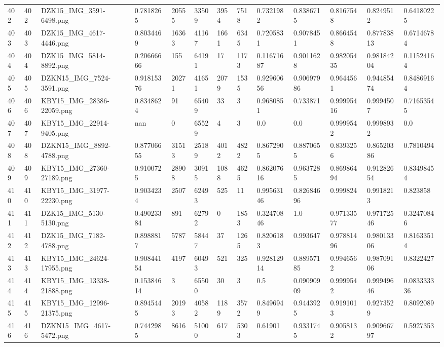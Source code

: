 \documentclass[11pt, a4paper, twoside]{report}
\begin{document}
\begin{longtable}[c]{@{}lllllllllllll@{}}
402 & 402 & DZK15\_IMG\_3591-6498.png & 0.7818265 & 20555 & 33509 & 3954 & 7518 & 0.7321982 & 0.8386715 & 0.8167548 & 0.8249512 & 0.64180225 \\
403 & 403 & DZK15\_IMG\_4617-4446.png & 0.8034469 & 16363 & 41167 & 1661 & 6345 & 0.7205831 & 0.9078451 & 0.8664548 & 0.87783813 & 0.67146784 \\
404 & 404 & DZK15\_IMG\_5814-8892.png & 0.20666666 & 155 & 64191 & 17 & 1173 & 0.11671687 & 0.9011628 & 0.98205435 & 0.98184204 & 0.11524164 \\
405 & 405 & DZKN15\_IMG\_7524-3591.png & 0.91815376 & 20271 & 41651 & 2079 & 1535 & 0.92960656 & 0.90697986 & 0.9644561 & 0.94485474 & 0.84869164 \\
406 & 406 & KBY15\_IMG\_28386-22059.png & 0.8348624 & 91 & 65409 & 33 & 3 & 0.9680851 & 0.733871 & 0.99995416 & 0.9994507 & 0.71653545 \\
407 & 407 & KBY15\_IMG\_22914-9405.png & nan & 0 & 65529 & 4 & 3 & 0.0 & 0.0 & 0.9999542 & 0.9998932 & 0.0 \\
408 & 408 & DZKN15\_IMG\_8892-4788.png & 0.87706655 & 31513 & 25189 & 4012 & 4822 & 0.8672905 & 0.8870655 & 0.8393256 & 0.86520386 & 0.7810494 \\
409 & 409 & KBY15\_IMG\_27360-27189.png & 0.9100725 & 28908 & 30915 & 1088 & 4625 & 0.86207616 & 0.9637285 & 0.86986494 & 0.91282654 & 0.83498454 \\
410 & 410 & KBY15\_IMG\_31977-22230.png & 0.9034234 & 2507 & 62493 & 525 & 11 & 0.99563146 & 0.82684696 & 0.999824 & 0.9918213 & 0.823858 \\
411 & 411 & DZK15\_IMG\_5130-5130.png & 0.49023384 & 891 & 62792 & 0 & 1853 & 0.32470846 & 1.0 & 0.97133577 & 0.97172546 & 0.32470846 \\
412 & 412 & DZK15\_IMG\_7182-4788.png & 0.8988817 & 5787 & 58447 & 37 & 1265 & 0.8206183 & 0.993647 & 0.97881496 & 0.98013306 & 0.81633514 \\
413 & 413 & KBY15\_IMG\_24624-17955.png & 0.90844154 & 4197 & 60493 & 521 & 325 & 0.92812914 & 0.88957185 & 0.9946562 & 0.98709106 & 0.8322427 \\
414 & 414 & KBY15\_IMG\_13338-21888.png & 0.15384614 & 3 & 65500 & 30 & 3 & 0.5 & 0.09090909 & 0.9999542 & 0.99949646 & 0.083333336 \\
415 & 415 & KBY15\_IMG\_12996-21375.png & 0.8945445 & 20193 & 40582 & 1189 & 3572 & 0.8496949 & 0.9443925 & 0.9191013 & 0.9273529 & 0.8092089 \\
416 & 416 & DZKN15\_IMG\_4617-5472.png & 0.7442985 & 8616 & 51000 & 617 & 5303 & 0.61901 & 0.9331745 & 0.9058132 & 0.90966797 & 0.5927353 \\

\end{longtable}
\end{document}
